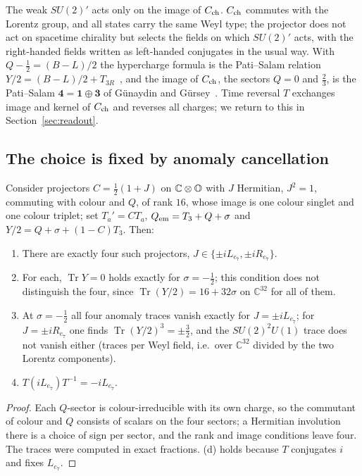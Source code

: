 The weak \(SU(2)'\) acts only on the image of \(C_{\rm ch}\).  \(C_{\rm ch}\) commutes with the Lorentz group, and all states carry the same Weyl
type; the projector does not act on spacetime chirality but selects the fields on which \(SU(2)'\) acts, with the right-handed fields
written as left-handed conjugates in the usual way.  With \(Q-\tfrac12=(B-L)/2\) the hypercharge formula is the Pati--Salam relation
\(Y/2=(B-L)/2+T_{3R}\)~\cite{baezhuerta}, and the image of \(C_{\rm ch}\), the sectors \(Q=0\) and \(\tfrac23\), is the Pati--Salam
\(\mathbf 4=\mathbf1\oplus\mathbf3\) of G\"unaydin and G\"ursey~\cite{gunaydin}.  Time reversal \(T\) exchanges image and kernel of \(C_{\rm ch}\) and
reverses all charges; we return to this in Section~\ref{sec:readout}.

\subsection{The choice is fixed by anomaly cancellation}

\begin{proposition}\label{prop:anomaly}
Consider projectors \(C=\tfrac12(1+J)\) on \(\mathbb C\otimes\mathbb O\) with \(J\) Hermitian, \(J^2=1\), commuting with colour and \(Q\), of
rank \(16\), whose image is one colour singlet and one colour triplet; set \(T_a'=CT_a\), \(Q_{\rm em}=T_3+Q+\sigma\) and
\(Y/2=Q+\sigma+(1-C)T_3\).  Then:
\begin{enumerate}[label=(\alph*)]
\item There are exactly four such projectors, \(J\in\{\pm iL_{e_7},\pm iR_{e_7}\}\).
\item For each, \(\operatorname{Tr}Y=0\) holds exactly for \(\sigma=-\tfrac12\); this condition does not distinguish the four, since
\(\operatorname{Tr}(Y/2)=16+32\sigma\) on \(\mathbb C^{32}\) for all of them.
\item At \(\sigma=-\tfrac12\) all four anomaly traces vanish exactly for \(J=\pm iL_{e_7}\); for \(J=\pm iR_{e_7}\) one finds
\(\operatorname{Tr}(Y/2)^3=\pm\tfrac32\), and the \(SU(2)^2U(1)\) trace does not vanish either (traces per Weyl field, i.e.\ over
\(\mathbb C^{32}\) divided by the two Lorentz components).
\item \(T(iL_{e_7})T^{-1}=-iL_{e_7}\).
\end{enumerate}
\end{proposition}

\begin{proof}
Each \(Q\)-sector is colour-irreducible with its own charge, so the commutant of colour and \(Q\) consists of scalars on the four
sectors; a Hermitian involution there is a choice of sign per sector, and the rank and image conditions leave four.  The traces
were computed in exact fractions.  (d) holds because \(T\) conjugates \(i\) and fixes \(L_{e_7}\).
\end{proof}

